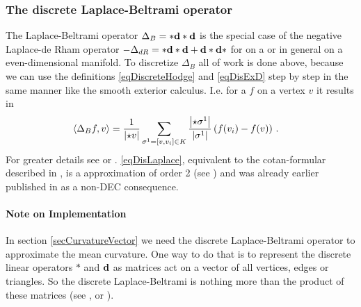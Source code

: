     \subsubsection{The discrete Laplace-Beltrami operator}
      The Laplace-Beltrami operator \( \Delta_{B}= * \mathbf{d} * \mathbf{d} \) is the special case of the negative Laplace-de Rham operator
      \( -\Delta_{dR} = *\mathbf{d} *\mathbf{d} + \mathbf{d} *\mathbf{d} * \) for  on a  or in general on a even-dimensional manifold.
      To discretize \( \Delta_{B} \) all of work is done above,
      because we can use the definitions \eqref{eqDiscreteHodge} and \eqref{eqDisExD} step by step in the same manner like the smooth exterior
      calculus.
      I.e. for a  \( f \) on a vertex \( v \) it results in
      \begin{align}
        \label{eqDisLaplace}
        \left\langle \Delta_{B} f, v \right\rangle
                &= \frac{1}{\left| \star v \right|} \sum_{\sigma^{1}=\left[ v,v_{i} \right]\in K} \frac{\left| \star\sigma^{1} \right|}{\left| \sigma^{1} \right|}
                       \left( f(v_{i}) - f(v) \right) \,\text{.}
      \end{align}
      For greater details see \cite{hirani} or \cite{desbrun}. 
      \eqref{eqDisLaplace}, equivalent to the cotan-formular described in \cite{meyer}, is a approximation of order 2 (see \cite{xu})
      and was already earlier published in \cite{arakawa} as a non-DEC consequence. 

      \paragraph{Note on Implementation}
        In section \ref{secCurvatureVector} we need the discrete Laplace-Beltrami operator to approximate the mean curvature.
        One way to do that is to represent the discrete linear operators \( * \) and \( \mathbf{d} \) as matrices act on
        a vector of all vertices, edges or triangles.
        So the discrete Laplace-Beltrami is nothing more than the product of these matrices 
        (see \cite{siggraphKap8}, \cite{pydec} or \cite{crane}).
        
